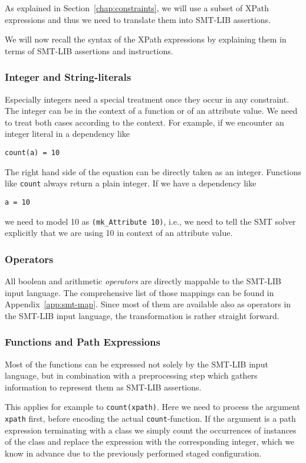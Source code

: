 As explained in Section~\ref{chap:constraints}, we will use a subset of XPath expressions and thus we need to translate them into SMT-LIB assertions. 

We will now recall the syntax of the XPath expressions by explaining them in terms of SMT-LIB assertions and instructions.

\subsubsection*{Integer and String-literals}

Especially integers need a special treatment once they occur in any constraint. The integer can be in the context of a function or of an attribute value. We need to treat both cases according to the context. For example, if we encounter an integer literal in a dependency like
\begin{verbatim}
count(a) = 10
\end{verbatim}
The right hand side of the equation can be directly taken as an integer. Functions like \verb|count| always return a plain integer. If we have a dependency like 
\begin{verbatim}
a = 10
\end{verbatim}
we need to model 10 as \verb|(mk_Attribute 10)|, i.e., we need to tell the SMT solver explicitly that we are using 10 in context of an attribute value.
 
\subsubsection*{Operators}

All boolean and arithmetic \emph{operators} are directly mappable to the SMT-LIB input language. The comprehensive list of those mappings can be found in Appendix~\ref{app:smt-map}. Since most of them are available also as operators in the SMT-LIB input language, the transformation is rather straight forward.

\subsubsection*{Functions and Path Expressions}

Most of the functions can be expressed not solely by the SMT-LIB input language, but in combination with a preprocessing step which gathers information to represent them as SMT-LIB assertions.

This applies for example to \verb|count(xpath)|. Here we need to process the argument \verb|xpath| first, before encoding the actual \verb|count|-function. If the argument is a path expression terminating with a class we simply count the occurrences of instances of the class and replace the expression with the corresponding integer, which we know in advance due to the previously performed staged configuration.

